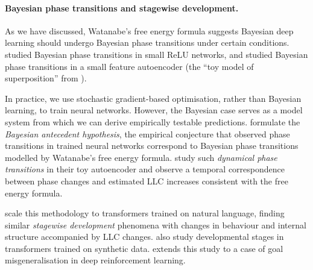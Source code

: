\documentclass[11pt]{article}
\begin{document}
\paragraph{Bayesian phase transitions and stagewise development.}
As we have discussed, Watanabe's free energy formula suggests Bayesian deep learning should undergo Bayesian phase transitions under certain conditions. \citet{Carroll2021} studied Bayesian phase transitions in small ReLU networks, and \citet{Chen+2023} studied Bayesian phase transitions in a small feature autoencoder (the ``toy model of superposition'' from \citealp{Elhage+2022}).

In practice, we use stochastic gradient-based optimisation, rather than Bayesian learning, to train neural networks. However, the Bayesian case serves as a model system from which we can derive empirically testable predictions. \citet{Chen+2023} formulate the \emph{Bayesian antecedent hypothesis}, the empirical conjecture that observed phase transitions in trained neural networks correspond to Bayesian phase transitions modelled by Watanabe's free energy formula.
\citet{Chen+2023} study such \emph{dynamical phase transitions} in their toy autoencoder and observe a temporal correspondence between phase changes and estimated LLC increases consistent with the free energy formula.

\citet{Wang+2024,Hoogland+2025} scale this methodology to transformers trained on natural language, finding similar \emph{stagewise development} phenomena with changes in behaviour and internal structure accompanied by LLC changes. \citet{Panickssery+Vaintrob2023,Hoogland+2025,Carroll+2025,Urdshals+Urdshals2025} also study developmental stages in transformers trained on synthetic data.
\citet{Elliott+2026} extends this study to a case of goal misgeneralisation in deep reinforcement learning.
\end{document}
